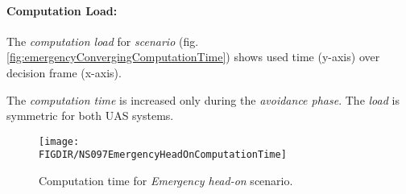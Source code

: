 \newpage
\paragraph{Computation Load:} The \emph{computation load} for \emph{scenario} (fig.\ref{fig:emergencyConvergingComputationTime}) shows used time (y-axis) over decision frame (x-axis).

The \emph{computation time} is increased only during the \emph{avoidance phase}. The \emph{load} is symmetric for both UAS systems.

\begin{figure}[H]
    \centering
    \texttt{[image: \\FIGDIR/NS097EmergencyHeadOnComputationTime]} 
    \caption{Computation time for \emph{Emergency head-on} scenario.}
    \label{fig:emergencyHeadOnComputationTime}
\end{figure}